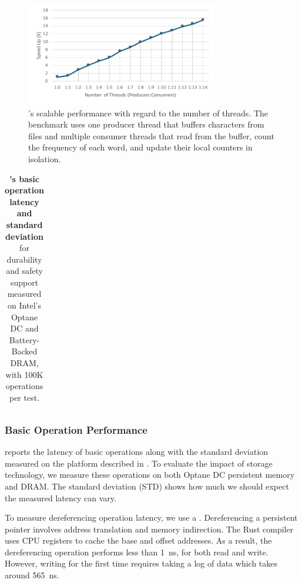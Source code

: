 \begin{figure}
    \begin{center}
    \includegraphics[width=3.3in]{Graphs/scal.pdf}
    \end{center}
    \caption{\label{fig:scal} \this{}'s scalable performance with regard to the number of threads.
    The  benchmark uses one producer thread that buffers characters from files and multiple consumer threads
    that read from the buffer, count the frequency of each word, and update their local counters in isolation.}
\end{figure}


\begin{table}
  \center
  \footnotesize
  \begin{tabular}{|l||c|c||c|c|}\hline
    
  \end{tabular}
  \caption{\textbf{\This's basic operation latency and standard deviation} for durability and safety support measured on Intel's Optane DC and Battery-Backed DRAM, with 100K operations per test. }
  \label{tab:microbench}
\end{table}

\subsubsection{Basic Operation Performance}

 reports the latency of basic operations along with the standard deviation measured on the platform described in . To evaluate the impact of storage technology, we measure these operations on both Optane DC persistent memory and DRAM. The standard deviation (STD) shows how much we should expect the measured latency can vary.

To measure dereferencing operation latency, we use a . Dereferencing a persistent pointer involves address translation and memory indirection. The Rust compiler uses CPU registers to cache the base and offset addresses. As a result, the dereferencing operation performs less than 1~ns, for both read and write. However, writing for the first time requires taking a log of data which takes around 565~ns.

